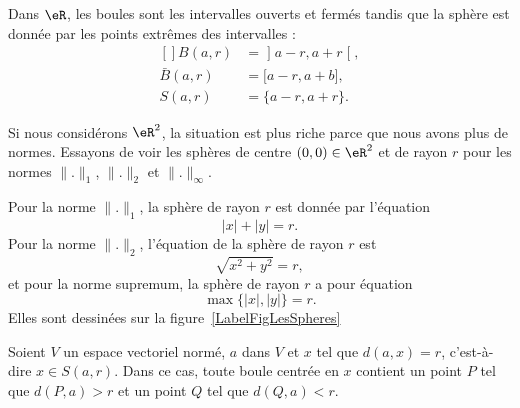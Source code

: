 \begin{example}
	Dans $\eR$, les boules sont  les intervalles ouverts et fermés tandis que la sphère est donnée par les points extrêmes des intervalles :
	\begin{equation}
		\begin{aligned}[]
			B(a,r)      & =\mathopen] a-r , a+r \mathclose[, \\
			\bar B(a,r) & =\mathopen[ a-r , a+b \mathclose], \\
			S(a,r)      & =\{ a-r,a+r \}.
		\end{aligned}
	\end{equation}
\end{example}

\begin{example}
	Si nous considérons $\eR^2$, la situation est plus riche parce que nous avons plus de normes. Essayons de voir les sphères de centre $(0,0)\in\eR^2$ et de rayon $r$ pour les normes $\| . \|_1$, $\| . \|_2$ et $\| . \|_{\infty}$.

	Pour la norme $\| . \|_1$, la sphère de rayon $r$ est donnée par l'équation
	\begin{equation}
		| x |+| y |=r.
	\end{equation}
	Pour la norme $\| . \|_2$, l'équation de la sphère de rayon $r$ est
	\begin{equation}
		\sqrt{x^2+y^2}=r,
	\end{equation}
	et pour la norme supremum, la sphère de rayon $r$ a pour équation
	\begin{equation}
		\max\{ | x |,| y | \}=r.
	\end{equation}
	Elles sont dessinées sur la figure~\ref{LabelFigLesSpheres}
	\newcommand{\CaptionFigLesSpheres}{Les sphères de rayon $1$ pour les trois normes classiques.}
	
\end{example}

\begin{proposition}		\label{PropBoitPtLoin}
	Soient $V$ un espace vectoriel normé, $a$ dans $V$ et $x$ tel que $d(a,x)=r$, c'est-à-dire $x\in S(a,r)$. Dans ce cas, toute boule centrée en $x$ contient un point $P$ tel que $d(P,a)>r$ et un point $Q$ tel que $d(Q,a)<r$.
\end{proposition}

